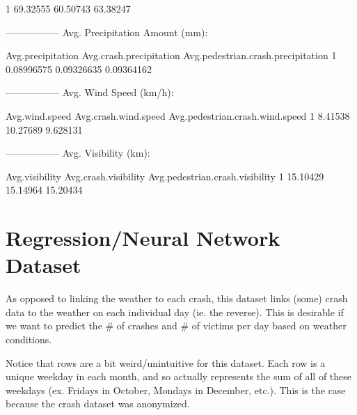 \documentclass[11pt, a4paper]{article}
\begin{document}
\begin{Schunk}
\begin{Soutput}
1     69.32555           60.50743                      63.38247
\end{Soutput}
\begin{Soutput}
-----------------
Avg. Precipitation Amount (mm):
\end{Soutput}
\begin{Soutput}
  Avg.precipitation Avg.crash.precipitation Avg.pedestrian.crash.precipitation
1        0.08996575              0.09326635                         0.09364162
\end{Soutput}
\begin{Soutput}
-----------------
Avg. Wind Speed (km/h):
\end{Soutput}
\begin{Soutput}
  Avg.wind.speed Avg.crash.wind.speed Avg.pedestrian.crash.wind.speed
1        8.41538             10.27689                        9.628131
\end{Soutput}
\begin{Soutput}
-----------------
Avg. Visibility (km):
\end{Soutput}
\begin{Soutput}
  Avg.visibility Avg.crash.visibility Avg.pedestrian.crash.visibility
1       15.10429             15.14964                        15.20434
\end{Soutput}
\end{Schunk}









\pagebreak
\section{Regression/Neural Network Dataset}

As opposed to linking the weather to each crash, this dataset links (some) crash data to the weather on each individual day (ie. the reverse). This is desirable if we want to predict the \# of crashes and \# of victims per day based on weather conditions. 


Notice that rows are a bit weird/unintuitive for this dataset. Each row is a unique weekday in each month, and so actually represents the sum of all of these weekdays (ex. Fridays in October, Mondays in December, etc.). This is the case because the crash dataset was anonymized. 
\end{document}
